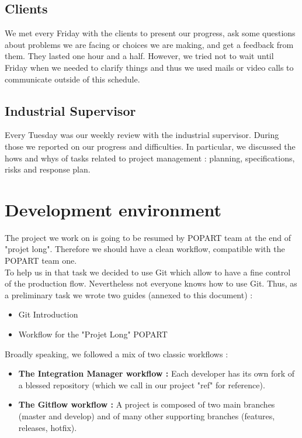\subsection{Clients}
We met every Friday with the clients to present our progress, ask some
questions about problems we are facing or choices we are making, and
get a feedback from them. They lasted one hour and a half. However,
we tried not to wait until Friday when we needed to clarify things and
thus we used mails or video calls to communicate outside of this
schedule.

\subsection{Industrial Supervisor}
Every Tuesday was our weekly review with the industrial
supervisor. During those we reported on our progress and
difficulties. In particular, we discussed the hows and whys of tasks
related to project management : planning, specifications, risks and
response plan.

\section{Development environment}
The project we work on is going to be resumed by POPART team
at the end of "projet long". Therefore we should have a clean workflow,
compatible with the POPART team one.\\

\noindent
To help us in that task we decided to use Git which allow to have
a fine control of the production flow.
Nevertheless not everyone knows how to use Git.
Thus, as a preliminary task we wrote two guides (annexed to this document) :
\begin{itemize}
  \setlength\itemsep{0em}
  \item Git Introduction
  \item Workflow for the "Projet Long" POPART
\end{itemize}

\noindent
Broadly speaking, we followed a mix of two classic workflows :
\begin{itemize}
  \setlength\itemsep{0em}
  \item \textbf{The Integration Manager workflow :}
    Each developer has its own fork of a blessed repository
    (which we call in our project "ref" for reference).
  \item \textbf{The Gitflow workflow :}
    A project is composed of two main branches (master and develop)
    and of many other supporting branches (features, releases, hotfix).
\end{itemize}


